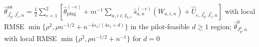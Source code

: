 \(\widehat\theta^{\mathrm{an}}_{J_y^*,J_z^*,n}=\frac12\sum_{e=1}^2[\widehat\theta_{\mathrm{plug}}^{(-e)}+m^{-1}\sum_{a,i\in I_{a,e}}\widehat s_{a,n}^{(-e)}(W_{a,i,n})+\widehat U_{e,J_y^*,J_z^*,n}]\) with local RMSE \(\min\{\rho^2,\rho n^{-1/2}+n^{-4s_z/(4s_z+d)}\}\) in the pilot-feasible \(d\ge1\) region; \(\widehat\theta^0_{J_y^0,n}\) with local RMSE \(\min\{\rho^2,\rho n^{-1/2}+n^{-1}\}\) for \(d=0\)
